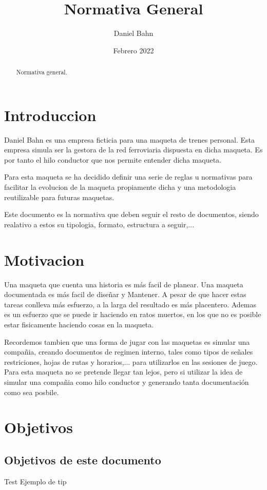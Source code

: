 \documentclass{article}
\begin{document}
\title{Normativa General}
\author{Daniel Bahn}
\date{Febrero 2022}
\maketitle
\makeHeader
\thispagestyle{fancy}
\begin{abstract}
    Normativa general.
\end{abstract}

\section{Introduccion}
Daniel Bahn es una empresa ficticia para una maqueta de trenes personal. Esta empresa simula ser la gestora de la red ferroviaria dispuesta en dicha maqueta.
Es por tanto el hilo conductor que nos permite entender dicha maqueta.

Para esta maqueta se ha decidido definir una serie de reglas u normativas para facilitar la evolucion de la maqueta propiamente dicha y una metodologia
reutilizable para futuras maquetas.

Este documento es la normativa que deben seguir el resto de documentos, siendo realativo a estos su tipologia, formato, estructura a seguir,...

\section{Motivacion}
Una maqueta que cuenta una historia es más facil de planear. Una maqueta documentada es más facil de diseñar y Mantener. A pesar de que hacer estas
tareas conlleva más esfuerzo, a la larga del resultado es más placentero. Ademas es un esfuerzo que se puede ir haciendo en ratos muertos, en los que 
no es posible estar fisicamente haciendo cosas en la maqueta.

Recordemos tambien que una forma de jugar con las maquetas es simular una compañia, creando documentos de regimen interno, tales como tipos de señales
restriciones, hojas de rutas y horarios,... para utilizarlos en las sesiones de juego. Para esta maqueta no se pretende llegar tan lejos, pero si
utilizar la idea de simular una compañia como hilo conductor y generando tanta documentación como sea posbile.

\section{Objetivos}
\subsection{Objetivos de este documento}

\begin{tip}{Test}
Ejemplo de tip
\end{tip}
\end{document}
